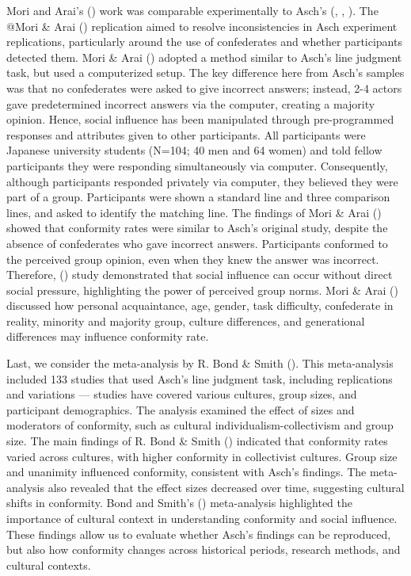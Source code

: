\documentclass[
  letterpaper,
]{book}
\begin{document}
Mori and Arai's () work was comparable
experimentally to Asch's (,
,
). The @Mori \& Arai
() replication aimed to resolve
inconsistencies in Asch experiment replications, particularly around the
use of confederates and whether participants detected them. Mori \& Arai
() adopted a method similar to Asch's
line judgment task, but used a computerized setup. The key difference
here from Asch's samples was that no confederates were asked to give
incorrect answers; instead, 2-4 actors gave predetermined incorrect
answers via the computer, creating a majority opinion. Hence, social
influence has been manipulated through pre-programmed responses and
attributes given to other participants. All participants were Japanese
university students (N=104; 40 men and 64 women) and told fellow
participants they were responding simultaneously via computer.
Consequently, although participants responded privately via computer,
they believed they were part of a group. Participants were shown a
standard line and three comparison lines, and asked to identify the
matching line. The findings of Mori \& Arai
() showed that conformity rates were
similar to Asch's original study, despite the absence of confederates
who gave incorrect answers. Participants conformed to the perceived
group opinion, even when they knew the answer was incorrect. Therefore,
() study demonstrated that social
influence can occur without direct social pressure, highlighting the
power of perceived group norms. Mori \& Arai
() discussed how personal acquaintance,
age, gender, task difficulty, confederate in reality, minority and
majority group, culture differences, and generational differences may
influence conformity rate.

Last, we consider the meta-analysis by R. Bond \& Smith
(). This meta-analysis included
133 studies that used Asch's line judgment task, including replications
and variations --- studies have covered various cultures, group sizes,
and participant demographics. The analysis examined the effect of sizes
and moderators of conformity, such as cultural
individualism-collectivism and group size. The main findings of R. Bond
\& Smith () indicated that
conformity rates varied across cultures, with higher conformity in
collectivist cultures. Group size and unanimity influenced conformity,
consistent with Asch's findings. The meta-analysis also revealed that
the effect sizes decreased over time, suggesting cultural shifts in
conformity. Bond and Smith's ()
meta-analysis highlighted the importance of cultural context in
understanding conformity and social influence. These findings allow us
to evaluate whether Asch's findings can be reproduced, but also how
conformity changes across historical periods, research methods, and
cultural contexts.
\end{document}
